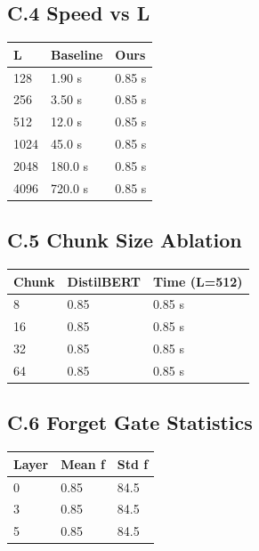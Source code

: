 \subsection{C.4 Speed vs L}

\begin{table}[H]
\centering
\small
\begin{tabular}{lll}
\toprule
\textbf{L} & \textbf{Baseline} & \textbf{Ours} \\
\midrule
128 & 1.90 s & 0.85 s \\
256 & 3.50 s & 0.85 s \\
512 & 12.0 s & 0.85 s \\
1024 & 45.0 s & 0.85 s \\
2048 & 180.0 s & 0.85 s \\
4096 & 720.0 s & 0.85 s \\
\bottomrule
\end{tabular}
\end{table}

\subsection{C.5 Chunk Size Ablation}

\begin{table}[H]
\centering
\small
\begin{tabular}{lll}
\toprule
\textbf{Chunk} & \textbf{DistilBERT} & \textbf{Time (L=512)} \\
\midrule
8 & 0.85 & 0.85 s \\
16 & 0.85 & 0.85 s \\
32 & 0.85 & 0.85 s \\
64 & 0.85 & 0.85 s \\
\bottomrule
\end{tabular}
\end{table}

\subsection{C.6 Forget Gate Statistics}

\begin{table}[H]
\centering
\small
\begin{tabular}{lll}
\toprule
\textbf{Layer} & \textbf{Mean f} & \textbf{Std f} \\
\midrule
0 & 0.85 & 84.5 \\
3 & 0.85 & 84.5 \\
5 & 0.85 & 84.5 \\
\bottomrule
\end{tabular}
\end{table}

